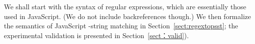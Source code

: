 We shall start with the syntax of regular expressions, which are essentially those used in JavaScript. (We do not include backreferences though.) We then formalize the semantics of JavaScript \regexp-string matching in Section~\ref{sect:regextopsst}; the experimental validation is presented in 
Section~\ref{sect：valid}).
%




%
%
%


